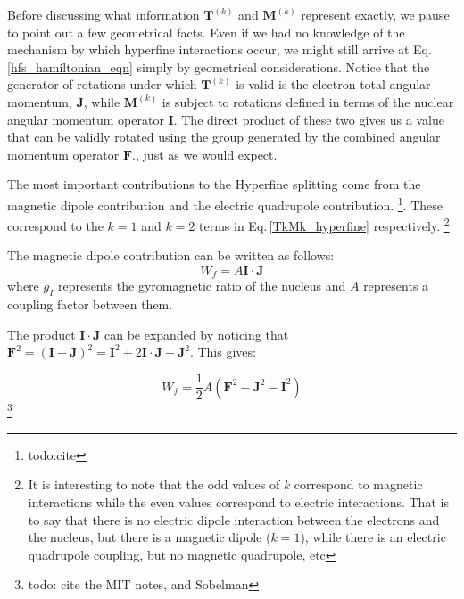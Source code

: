 Before discussing what information $\mathbf{T}^{(k)}$ and $\mathbf{M}^{(k)}$ represent exactly,
we pause to point out a few geometrical facts. Even if we had no knowledge of the mechanism by which hyperfine interactions occur, we might still arrive at Eq.\,\ref{hfs_hamiltonian_eqn} simply by geometrical considerations.
Notice that the generator of rotations under which $\mathbf{T}^{(k)}$ is valid is the electron total angular momentum, $\mathbf{J}$, while $\mathbf{M}^{(k)}$ is subject to rotations defined in terms of the nuclear angular momentum operator $\mathbf{I}$. The direct product of these two gives us a value that can be validly rotated using the group generated by the combined angular momentum operator $\mathbf{F}$.\cite{Racah2}\cite{sobelman_spectra}, just as we would expect.


The most important contributions to the Hyperfine splitting come from the magnetic dipole contribution and the electric quadrupole contribution. \footnote{todo:cite}. \cite{sobelman_spectra} These correspond to the $k=1$ and $k=2$ terms in Eq.\,\ref{TkMk_hyperfine} respectively. 
\footnote{It is interesting to note that the odd values of $k$ correspond to magnetic interactions while the even values correspond to electric interactions. That is to say that there is no electric dipole interaction between the electrons and the nucleus, but there is a magnetic dipole ($k=1$), while there is an electric quadrupole coupling, but no magnetic quadrupole, etc}
\cite{experimental_hyperfine_alkali_arimondo}

The magnetic dipole contribution can be written as follows: 
\begin{equation}
W_f=A\mathbf{I}\cdot\mathbf{J}
\end{equation}
\cite{sobelman_spectra}
where $g_I$ represents the gyromagnetic ratio of the nucleus and $A$ represents a coupling factor between them. %

The product $\mathbf{I}\cdot\mathbf{J}$ can be expanded by noticing that $\mathbf{F}^2=(\mathbf{I}+\mathbf{J})^2=\mathbf{I}^2+2 \mathbf{I}\cdot\mathbf{J}+\mathbf{J}^2$. This gives: 

\begin{equation}\label{Wf_dot_product}
W_f=\frac{1}{2}A(\mathbf{F}^2-\mathbf{J}^2-\mathbf{I}^2)
\end{equation}
\footnote{todo: cite the MIT notes, and Sobelman}

